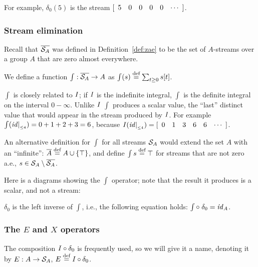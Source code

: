 For example, $\delta_0(5)$ is the stream $\sv{5 0 0 0 0}$.

\subsubsection{Stream elimination}\label{sec:stream-elimination}

Recall that $\overline{\mathcal{S}_{A}}$ was defined in Definition~\ref{def:zae} to be the set of 
$A$-streams over a group $A$ that are zero almost everywhere. 

\begin{definition}
We define a function $\int : \overline{\mathcal{S}_{A}} \rightarrow
A$ as $\int(s) \stackrel{\textrm{\scriptsize def}}{=} \sum_{t \geq 0} s[t]$.
\end{definition}

$\int$ is closely related to $\mathit{I}$; if $\mathit{I}$ is the
indefinite integral, $\int$ is the definite integral on the
interval $0 - \infty$.   Unlike $\mathit{I}$
$\int$ produces a scalar value, the ``last'' distinct value that would
appear in the stream produced by $\mathit{I}$.
For example $\int(\mathit{id}|_{_{\leq 4}}) = 0 + 1 + 2 + 3 = 6$, because
$\I(\cut{\id}{4}) = \sv{0 1 3 6 6}$.

An alternative definition for $\int$ for all streams $\mathcal{S}_{A}$
would extend the set $A$ with an ``infinite'':
$\overline{A} \stackrel{\textrm{\scriptsize def}}{=} A \cup \{ \top \}$, and define $\int{s} \stackrel{\textrm{\scriptsize def}}{=}
\top$ for streams that are not zero a.e., $s \in \mathcal{S}_{A} \setminus \overline{\mathcal{S}_{A}}$.

Here is a diagrams showing the $\int$ operator; note that  the result it 
produces is a scalar, and not a stream:

\begin{center}
\end{center}

$\delta_0$ is the left inverse of $\int$, i.e., the
following equation holds: $\int \circ \;\delta_0 = \mathit{id}_A$.  

\subsubsection{The $E$ and $X$ operators}

The composition $\mathit{I} \circ \delta_0$ is frequently used, so we 
will give it a name, denoting it by $E: A \to \mathcal{S}_{A}$, $E \stackrel{\textrm{\scriptsize def}}{=} \mathit{I} \circ \delta_0$.

